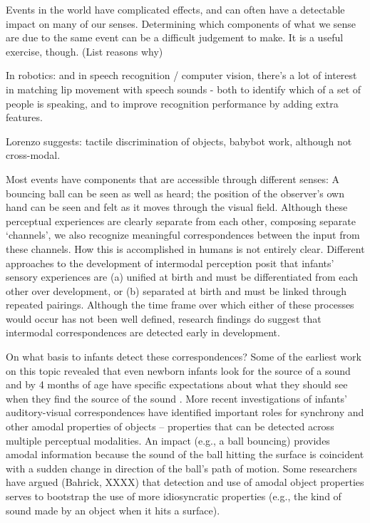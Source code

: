 
Events in the world have complicated effects, and can often have
a detectable impact on many of our senses.  Determining which
components of what we sense are due to the same event can be a 
difficult judgement to make.  It is a useful exercise, though.
(List reasons why)


\cite{lewkowicz00development}
\cite{lewkowicz80crossmodal}
\cite{lewkowicz04learning}
\cite{bahrick04development}
\cite{hernandez01development}
\cite{bahrick03development}
\cite{bahrick00intersensory}
\cite{gibson86ecological}
\cite{prince05synching}

In robotics: and in speech recognition / computer vision, there's
a lot of interest in matching lip movement with speech sounds - 
both to identify which of a set of people is speaking, and to
improve recognition performance by adding extra features.

Lorenzo suggests: tactile discrimination of objects, babybot work,
although not cross-modal.

Most events have components that are accessible through different
senses: A bouncing ball can be seen as well as heard; the position of
the observer's own hand can be seen and felt as it moves through the
visual field.  Although these perceptual experiences are clearly
separate from each other, composing separate `channels', we also
recognize meaningful correspondences between the input from these
channels.  How this is accomplished 
%
in humans 
%
is not entirely clear.  Different
approaches to the development of intermodal perception posit that
infants' sensory experiences are (a) unified at birth and must be
differentiated from each other over development, or (b) separated at
birth and must be linked through repeated pairings. Although the time
frame over which either of these processes would occur has not been
well defined, research findings do suggest that intermodal
correspondences are detected early in development.

On what basis to infants detect these correspondences?  Some of the
earliest work on this topic revealed that even newborn infants look
for the source of a sound \cite{butterworth76coordination} and by 4
months of age have specific expectations about what they should see
when they find the source of the sound \cite{spelke76infants}.  More recent
investigations of infants' auditory-visual correspondences have
identified important roles for synchrony and other amodal properties
of objects -- properties that can be detected across multiple
perceptual modalities.  An impact (e.g., a ball bouncing) provides
amodal information because the sound of the ball hitting the surface
is coincident with a sudden change in direction of the ball's path of
motion.  Some researchers have argued (Bahrick, XXXX) that detection
and use of amodal object properties serves to bootstrap the use of
more idiosyncratic properties (e.g., the kind of sound made by an
object when it hits a surface).

